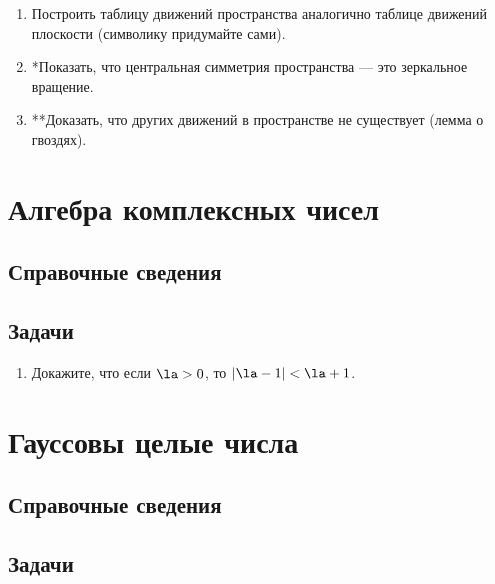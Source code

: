 \begin{enumerate}
\item Построить таблицу движений пространства аналогично таблице движений плоскости (символику придумайте сами).
\item *Показать, что центральная симметрия пространства --- это зеркальное вращение.
\item **Доказать, что других движений в пространстве не существует (лемма о гвоздях).
\end{enumerate}



\begin{comment}
\chapter{12. Комплексная арифметика и алгебра}
\end{comment}


\section{Алгебра комплексных чисел}

\subsection*{Справочные сведения}

\subsection*{Задачи}


\begin{enumerate}
\item Докажите, что если $\la>0$, то $|\la-1|<\la+1$.

\end{enumerate}


\section{Гауссовы целые числа}

\subsection*{Справочные сведения}

\subsection*{Задачи}

